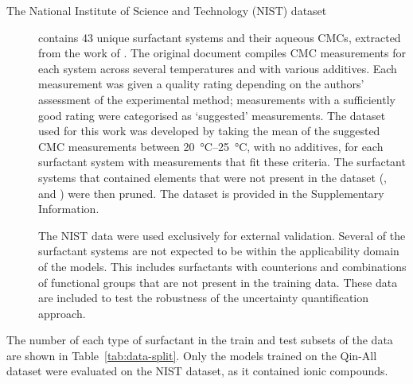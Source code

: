\begin{description}
    \item[The National Institute of Science and Technology (NIST) dataset]
          contains 43 unique surfactant systems and their aqueous CMCs, extracted
          from the work of \citet{mukerjeeCriticalMicelleConcentrations1971}. The
          original document compiles CMC measurements for each system across
          several temperatures and with various additives. Each measurement was
          given a quality rating depending on the authors' assessment of the
          experimental method; measurements with a sufficiently good rating were
          categorised as `suggested' measurements. The dataset used for this work
          was developed by taking the mean of the suggested CMC measurements
          between \SIrange{20}{25}{\degreeCelsius}, with no additives, for
          each surfactant system with measurements that fit these criteria. The
          surfactant systems that contained elements that were not present in the
          dataset (,  and ) were then pruned. The dataset is
          provided in the Supplementary Information.

          The NIST data were used exclusively for external validation. Several
          of the surfactant systems are not expected to be within the
          applicability domain of the models. This includes surfactants with
          counterions and combinations of functional groups that are not present
          in the training data. These data are included to test the robustness
          of the uncertainty quantification approach.
\end{description}

The number of each type of surfactant in the train and test subsets of the data are shown in Table~\ref{tab:data-split}. Only the models trained on the Qin-All dataset were evaluated on the NIST dataset, as it contained ionic compounds.

